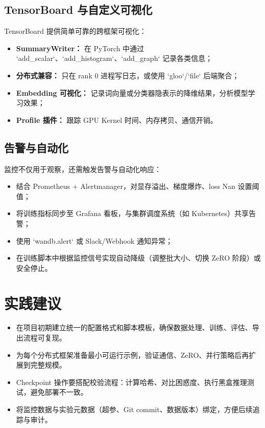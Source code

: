 \documentclass[UTF8,zihao=-4]{ctexart}
\begin{document}
\subsection{TensorBoard 与自定义可视化}
TensorBoard 提供简单可靠的跨框架可视化：
\begin{itemize}
  \item \textbf{SummaryWriter：} 在 PyTorch 中通过 `add_scalar`、`add_histogram`、`add_graph` 记录各类信息；
  \item \textbf{分布式兼容：} 只在 rank 0 进程写日志，或使用 `gloo`/`file` 后端聚合；
  \item \textbf{Embedding 可视化：} 记录词向量或分类器隐表示的降维结果，分析模型学习效果；
  \item \textbf{Profile 插件：} 跟踪 GPU Kernel 时间、内存拷贝、通信开销。
\end{itemize}

\subsection{告警与自动化}
监控不仅用于观察，还需触发告警与自动化响应：
\begin{itemize}
  \item 结合 Prometheus + Alertmanager，对显存溢出、梯度爆炸、loss Nan 设置阈值；
  \item 将训练指标同步至 Grafana 看板，与集群调度系统（如 Kubernetes）共享告警；
  \item 使用 `wandb.alert` 或 Slack/Webhook 通知异常；
  \item 在训练脚本中根据监控信号实现自动降级（调整批大小、切换 ZeRO 阶段）或安全停止。
\end{itemize}

\section*{实践建议}
\begin{itemize}
  \item 在项目初期建立统一的配置格式和脚本模板，确保数据处理、训练、评估、导出流程可复现。
  \item 为每个分布式框架准备最小可运行示例，验证通信、ZeRO、并行策略后再扩展到完整规模。
  \item Checkpoint 操作要搭配校验流程：计算哈希、对比困惑度、执行黑盒推理测试，避免部署不一致。
  \item 将监控数据与实验元数据（超参、Git commit、数据版本）绑定，方便后续追踪与审计。
\end{itemize}
\end{document}
